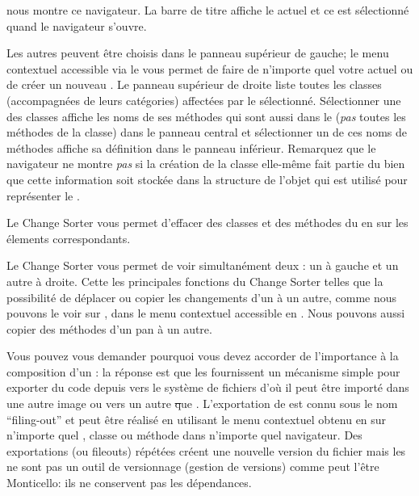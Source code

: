 \documentclass[a4paper,10pt,twoside]{book}
\begin{document}
 nous montre ce navigateur. La barre de titre affiche le \changeset actuel et ce \changeset est sélectionné quand le navigateur s'ouvre.

Les autres \changesets peuvent être choisis dans le panneau supérieur de gauche;
le menu contextuel accessible via le  vous permet de faire de
n'importe quel \changeset votre \changeset actuel ou de créer un nouveau \changeset.
Le panneau supérieur de droite liste toutes les classes 
(accompagnées de leurs catégories) affectées par le \changeset sélectionné.
Sélectionner une des classes affiche les noms de ses méthodes qui sont aussi dans
le \changeset (\emph{pas} toutes les méthodes de la classe) dans le panneau central
et sélectionner un de ces noms de méthodes affiche sa définition dans le panneau
inférieur.
Remarquez que le navigateur ne montre \emph{pas} si la création de la classe elle-même
fait partie du \changeset bien que cette information soit stockée dans la structure
de l'objet qui est utilisé pour représenter le \changeset.

Le Change Sorter vous permet d'effacer des classes et des méthodes du \changeset
en  \actclickant{} sur les élements correspondants.

Le Change Sorter vous permet de voir simultanément deux
\changesets: un \changeset à gauche et un autre à droite.
Cette  les principales fonctions du Change Sorter 
telles que la possibilité de déplacer ou copier les changements d'un \changeset à un autre,
comme nous pouvons le voir sur ,
dans le menu contextuel accessible en \actclickant.
Nous pouvons aussi copier des méthodes d'un pan à un autre.

Vous pouvez vous demander pourquoi vous devez accorder de l'importance à la composition
d'un \changeset: la réponse est que les \changesets fournissent un mécanisme simple
pour exporter du code depuis \pharo vers le système de fichiers d'où il peut
être importé dans une autre image \pharo ou vers un autre \st que \pharo.
L'exportation de \changeset est connu sous le nom ``filing-out'' et peut être réalisé
en utilisant le menu contextuel obtenu en \actclickant{} sur n'importe quel \changeset, classe ou
méthode dans n'importe quel navigateur.
Des exportations (ou fileouts) répétées créent une nouvelle version du fichier
mais les \changesets ne sont pas un outil de versionnage (gestion de
versions) comme peut l'être Monticello:
ils ne conservent pas les dépendances.
\end{document}
